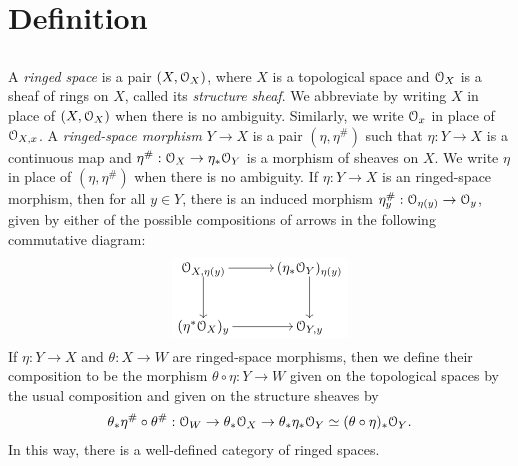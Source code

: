 \documentclass[10pt,final,oneside]{amsbook}
\numberwithin{equation}{section}
\begin{document}
\section{Definition}

\subsection{}

A \emph{ringed space} is a pair $(X, \cal{O}_X)$, where $X$ is a topological space and $\cal{O}_X$ is a sheaf of rings on $X$, called its \emph{structure sheaf}.
We abbreviate by writing $X$ in place of $(X, \cal{O}_X)$ when there is no ambiguity.
Similarly, we write $\cal{O}_x$ in place of $\cal{O}_{X, x}$.
A \emph{ringed-space morphism} $Y \to X$ is a pair $(\eta, \eta^\#)$ such that $\eta : Y \to X$ is a continuous map and $\eta^\# : \cal{O}_X \to \eta_\ast \cal{O}_Y$ is a morphism of sheaves on $X$.
We write $\eta$ in place of $(\eta, \eta^\#)$ when there is no ambiguity.
If $\eta : Y \to X$ is an ringed-space morphism, then for all $y \in  Y$, there is an induced morphism $\eta_y^\# : \cal{O}_{\eta(y)} \to \cal{O}_{y}$, given by either of the possible compositions of arrows in the following commutative diagram:
\begin{equation}
\begin{tikzpicture}[baseline=(current  bounding  box.center)]
\tikzstyle{every node}=[fill=white,  inner sep=2pt]
\matrix (m)
[	matrix of math nodes,
	row sep 		=	3em,
	column sep 	=	3em,
	text height	=	1.5ex,
	text depth	=	0.25ex
]
{ 		\cal{O}_{X, \eta(y)}		&(\eta_\ast \cal{O}_Y)_{\eta(y)}	\\
		(\eta^\ast\cal{O}_X)_y	&\cal{O}_{Y, y}\\
};
\path[->, font=\small]
(m-1-1) edge 	(m-1-2)
(m-1-1) edge 	(m-2-1)
(m-1-2) edge 	(m-2-2)
(m-2-1) edge 	(m-2-2);
\end{tikzpicture}
\end{equation}
If $\eta : Y \to X$ and $\theta : X \to W$ are ringed-space morphisms, then we define their composition to be the morphism $\theta \circ \eta : Y \to W$ given on the topological spaces by the usual composition and given on the structure sheaves by
\begin{align}
\theta_\ast\eta^\# \circ \theta^\# : \cal{O}_W \to \theta_\ast \cal{O}_X \to \theta_\ast \eta_\ast \cal{O}_Y \simeq (\theta \circ \eta)_\ast \cal{O}_Y.
\end{align}
In this way, there is a well-defined category of ringed spaces.
\end{document}
